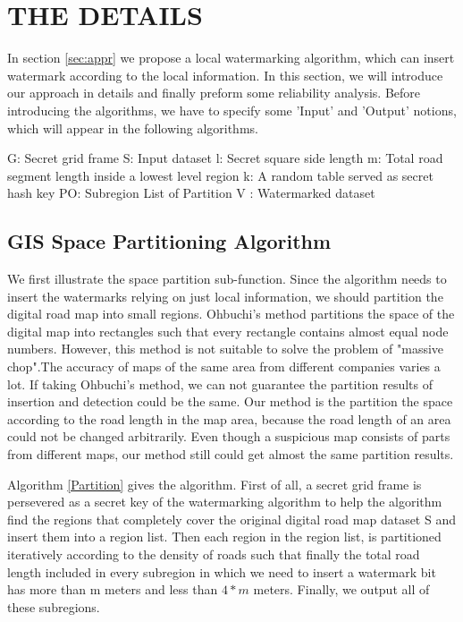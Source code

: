 \section{THE DETAILS}
\label{sec:details}
In section \ref{sec:appr} we propose a local watermarking algorithm, which
can insert watermark according to the local information. In this section, we 
will introduce our approach in details and finally preform some reliability 
analysis. Before introducing the algorithms, we have to specify some 'Input'
and 'Output' notions, which will appear in the following algorithms.

\begin{algorithm}[h]
\begin{algorithmic}[1]
\State 	   G: Secret grid frame
\State     S: Input dataset
\State     l: Secret square side length
\State     m: Total road segment length inside a lowest level region
\State     k: A random table served as secret hash key
\State     PO: Subregion List of Partition
\State     V : Watermarked dataset
\end{algorithmic}
\end{algorithm}

\subsection{GIS Space Partitioning Algorithm}

We first illustrate the space partition sub-function. Since the algorithm 
needs to insert the watermarks relying on just local information,
we should partition the digital road map into small regions. Ohbuchi's method 
\cite{OhbuchiUE02} partitions the space of the digital map into rectangles 
such that every rectangle contains almost equal node numbers. However, this
method is not suitable to solve the problem of "massive chop".The accuracy 
of maps of the same area from different companies varies a lot. If taking Ohbuchi's
method, we can not guarantee the partition results of insertion and detection could 
be the same. Our method is the partition the space according to the road length in 
the map area, because the road length of an area could not be changed arbitrarily. 
Even though a suspicious map consists of parts from different maps, our method still
could get almost the same partition results.


Algorithm \ref{Partition} gives the algorithm. First of all, a secret grid frame is 
persevered as a secret key of the watermarking algorithm to help the algorithm find 
the regions that completely cover the original digital road map dataset S and insert 
them into a region list. Then each region in the region list, is partitioned iteratively 
according to the density of roads such that finally the total road length included in every
subregion in which we need to insert a watermark bit has more than m meters and less than 
$4 * m$ meters. Finally, we output all of these subregions.

